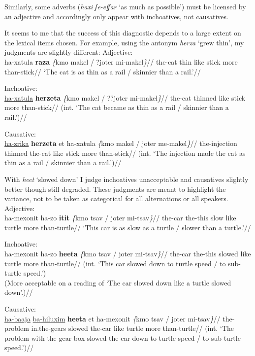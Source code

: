 Similarly, some adverbs (\emph{haxi ʃe-efʃar} `as much as possible') must be licensed by an adjective and accordingly only appear with inchoatives, not causatives.

It seems to me that the success of this diagnostic depends to a large extent on the lexical items chosen. For example, using the antonym \emph{herza} `grew thin', my judgments are slightly different:
\pex
  \a Adjective:\\ \begingl
    \gla ha-xatula \textbf{raza} \emph{\{}kmo makel / ?joter mi-makel\emph{\}}//
    \glb the-cat thin like stick {} more than-stick//
    \glft `The cat is as thin as a rail / skinnier than a rail.'//
  \endgl
  
  \a Inchoative:\\ \begingl
    \gla{}\underline{ha-xatula} \textbf{herzeta} \emph{\{}kmo makel / ??joter mi-makel\emph{\}}//
    \glb the-cat thinned like stick {} more than-stick//
    \glft (int. `The cat became as thin as a rail / skinnier than a rail.')//
  \endgl

  \a Causative:\\ \begingl
    \gla {}\underline{ha-zrika} \textbf{herzeta} et ha-xatula \emph{\{}kmo makel / joter me-makel\emph{\}}//
    \glb the-injection thinned  the-cat like stick {} more than-stick//
    \glft (int. `The injection made the cat as thin as a rail / skinnier than a rail.')//
  \endgl
\xe

With \emph{heet} `slowed down' I judge inchoatives unacceptable and causatives slightly better though still degraded. These judgments are meant to highlight the variance, not to be taken as categorical for all alternations or all speakers.
\pex
	\a Adjective:\\ \begingl
		\gla ha-mexonit ha-zo \textbf{itit} \emph{\{}kmo {ts}av / joter mi-{ts}av\emph{\}}//
		\glb the-car the-this slow like turtle {} more than-turtle//
		\glft `This car is as slow as a turtle / slower than a turtle.'//
	\endgl

	\a Inchoative:\\ \begingl
		\gla\ljudge{*}ha-mexonit ha-zo \textbf{heeta} \emph{\{}kmo {ts}av / joter mi-{ts}av\emph{\}}//
		\glb the-car the-this slowed like turtle {} more than-turtle//
		\glft (int. `This car slowed down to turtle speed / to sub-turtle speed.')\\
			(More acceptable on a reading of `The car slowed down like a turtle slowed down'.)//
	\endgl

	\a Causative:\\ \begingl
		\gla{}\underline{ha-baaja} \underline{ba-hiluxim} \textbf{heeta} et ha-mexonit \emph{\{}kmo {ts}av / joter mi-{ts}av\emph{\}}//
		\glb the-problem in.the-gears slowed  the-car like turtle {} more than-turtle//
		\glft (int. `The problem with the gear box slowed the car down to turtle speed / to sub-turtle speed.')//
	\endgl
\xe

